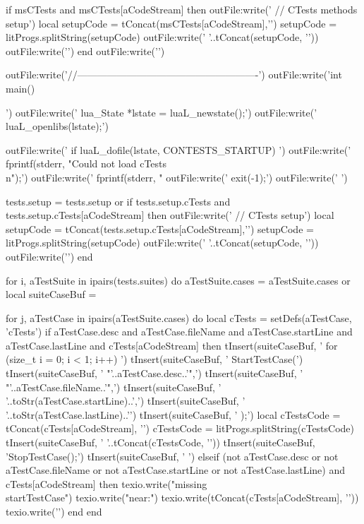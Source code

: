   if msCTests and
    msCTests[aCodeStream] then
    outFile:write('  // CTests methods setup\n')
    local setupCode = tConcat(msCTests[aCodeStream],'\n')
    setupCode       = litProgs.splitString(setupCode)
    outFile:write('  '..tConcat(setupCode, '\n  '))
    outFile:write('\n\n')
  end
  outFile:write('\n\n')

  outFile:write('//-------------------------------------------------------\n')
  outFile:write('int main(){\n\n')
  outFile:write('  lua_State *lstate = luaL_newstate();\n')
  outFile:write('  luaL_openlibs(lstate);\n\n')

  outFile:write('  if luaL_dofile(lstate, CONTESTS_STARTUP) {\n')
  outFile:write('    fprintf(stderr, "Could not load cTests\\n");\n')
  outFile:write('    fprintf(stderr, "%
  outFile:write('    exit(-1);\n')
  outFile:write('  }\n\n')

  tests.setup = tests.setup or { }
  if tests.setup.cTests and
    tests.setup.cTests[aCodeStream] then
    outFile:write('  // CTests setup\n')
    local setupCode = tConcat(tests.setup.cTests[aCodeStream],'\n')
    setupCode       = litProgs.splitString(setupCode)
    outFile:write('  '..tConcat(setupCode, '\n  '))
    outFile:write('\n\n')
  end

  for i, aTestSuite in ipairs(tests.suites) do
    aTestSuite.cases = aTestSuite.cases or { }
    local suiteCaseBuf = { }

    for j, aTestCase in ipairs(aTestSuite.cases) do
      local cTests     = setDefs(aTestCase, 'cTests')
      if aTestCase.desc and
        aTestCase.fileName and
        aTestCase.startLine and
        aTestCase.lastLine and
        cTests[aCodeStream] then
        tInsert(suiteCaseBuf, '    for (size_t i = 0; i < 1; i++) {\n\n')
        tInsert(suiteCaseBuf, '      StartTestCase(\n')
        tInsert(suiteCaseBuf, '        "'..aTestCase.desc..'",\n')
        tInsert(suiteCaseBuf, '        "'..aTestCase.fileName..'",\n')
        tInsert(suiteCaseBuf, '        '..toStr(aTestCase.startLine)..',\n')
        tInsert(suiteCaseBuf, '        '..toStr(aTestCase.lastLine)..'\n')
        tInsert(suiteCaseBuf, '      );\n\n  ')
        local cTestsCode = tConcat(cTests[aCodeStream], '\n')
        cTestsCode       = litProgs.splitString(cTestsCode)
        tInsert(suiteCaseBuf, '    '..tConcat(cTestsCode, '\n      '))
        tInsert(suiteCaseBuf, '\n\n      StopTestCase();\n\n')
        tInsert(suiteCaseBuf, '    }\n\n')
      elseif (not aTestCase.desc or
        not aTestCase.fileName or
        not aTestCase.startLine or
        not aTestCase.lastLine) and
        cTests[aCodeStream] then
        texio.write("\nERROR missing \\startTestCase\n")
        texio.write("near:\n")
        texio.write(tConcat(cTests[aCodeStream], '\n'))
        texio.write('\n')
      end
    end

}
